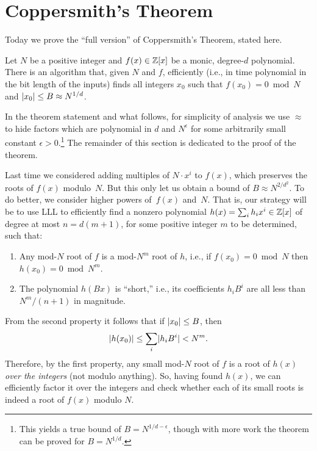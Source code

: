 \documentclass[11pt]{article}
\begin{document}
\thispagestyle{fancy} %


\section{Coppersmith's Theorem}
\label{sec:coppersmith}

Today we prove the ``full version'' of Coppersmith's Theorem, stated
here.

\begin{theorem}
  \label{thm:coppersmith}
  Let $N$ be a positive integer and $f(x) \in \mathbb{Z}[x]$ be a monic,
  degree-$d$ polynomial.  There is an algorithm that, given $N$ and
  $f$, efficiently (i.e., in time polynomial in the bit length of the
  inputs) finds all integers $x_{0}$ such that $f(x_{0}) = 0 \bmod N$
  and $\lvert x_{0}\rvert \leq B \approx N^{1/d}$.
\end{theorem}

In the theorem statement and what follows, for simplicity of analysis
we use $\approx$ to hide factors which are polynomial in $d$ and
$N^{\epsilon}$ for some arbitrarily small constant $\epsilon >
0$.\footnote{This yields a true bound of $B = N^{1/d-\epsilon}$,
  though with more work the theorem can be proved for $B=N^{1/d}$.}
The remainder of this section is dedicated to the proof of the
theorem.

Last time we considered adding multiples of $N \cdot x^{i}$ to $f(x)$,
which preserves the roots of $f(x)$ modulo~$N$.  But this only let us
obtain a bound of $B \approx N^{2/d^{2}}$.  To do better, we consider
higher powers of~$f(x)$ and~$N$.  That is, our strategy will be to use
LLL to efficiently find a nonzero polynomial $h(x) = \sum_{i} h_{i}
x^{i} \in \mathbb{Z}[x]$ of degree at most $n = d(m+1)$, for some positive
integer $m$ to be determined, such that:
\begin{enumerate}[itemsep=0pt]
\item Any mod-$N$ root of $f$ is a mod-$N^{m}$ root of $h$, i.e., if
  $f(x_{0}) = 0 \bmod N$ then $h(x_{0}) = 0 \bmod N^{m}$.
\item The polynomial $h(Bx)$ is ``short,'' i.e., its coefficients
  $h_{i} B^{i}$ are all less than $N^{m}/(n+1)$ in magnitude.
\end{enumerate}
From the second property it follows that if $\lvert x_{0}\rvert \leq B$, then
\[ \lvert h(x_{0})\rvert \leq \sum_{i} \lvert h_{i} B^{i}\rvert < N^{m}. \]
Therefore, by the first property, any small mod-$N$ root of $f$ is a
root of $h(x)$ \emph{over the integers} (not modulo anything).  So,
having found $h(x)$, we can efficiently factor it over the integers
and check whether each of its small roots is indeed a root of $f(x)$
modulo $N$.
\end{document}
